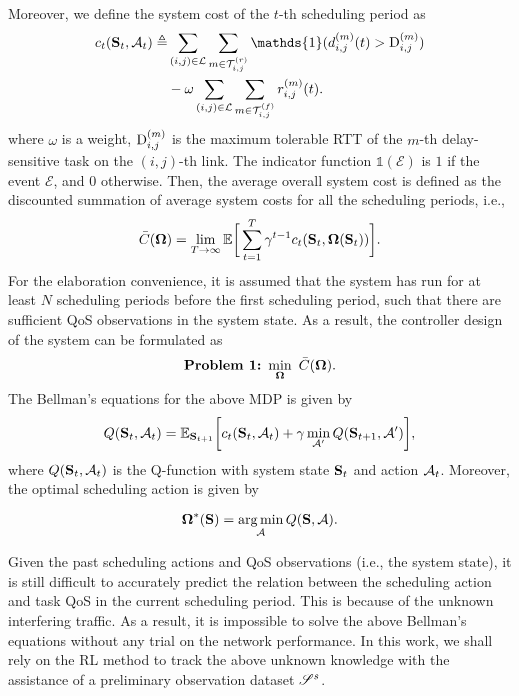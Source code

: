 Moreover, we define the system cost of the $t$-th scheduling period as
\begin{align}
    \label{eq:cost function}
    \begin{split}
        c_t(\state_t, \action_t)
        \define
         & \sum_{\iterLink} \sum_{\iterTaskRTT}
        \mathds{1}(\eleRTT(t) > \eleRTTLimit)                          \\
         & - \omega \sum_{\iterLink} \sum_{\iterTaskThru} \eleThru(t).
    \end{split}
\end{align}
where $\omega$ is a weight, $\mathrm{D}_{i,j}^{(m)}$ is the maximum tolerable RTT of the $m$-th delay-sensitive task on the $(i,j)$-th link. The indicator function $\mathds{1}(\mathcal{E})$ is $1$ if the event $\mathcal{E}$, and $0$ otherwise.
Then, the average overall system cost is defined as the discounted summation of average system costs for all the scheduling periods, i.e.,
\begin{equation}
    \label{eq:average_cost}
    \bar{C}(\boldsymbol{\Omega}) = \lim_{T \rightarrow \infty} \mathbb{E}
    \bigg[
        \sum_{t = 1}^T \gamma^{t-1} c_t(\mathbf{S}_t, \boldsymbol{\Omega}(\mathbf{S}_t))
        \bigg].
\end{equation}
For the elaboration convenience, it is assumed that the system has run for at least $N$ scheduling periods before the first scheduling period, such that there are sufficient QoS observations in the system state. As a result, the controller design of the {\algName} system can be formulated as
\begin{equation}
    \text{\bf Problem 1:} \ \min_{\boldsymbol{\Omega}} \  \bar{C}(\boldsymbol{\Omega}).
\end{equation}
The Bellman's equations for the above MDP is given by
\begin{align}
    \label{eq:bellman}
    Q(\mathbf{S}_t, \mathcal{A}_t) = \mathbb{E}_{\mathbf{S}_{t+1}} \bigg[ c_t(\mathbf{S}_t, \mathcal{A}_t) + \gamma \min_{\mathcal{A}'} Q(\mathbf{S}_{t+1}, \mathcal{A}')  \bigg],
\end{align}
where $Q(\mathbf{S}_t, \mathcal{A}_t)$ is the Q-function with system state $\mathbf{S}_t$ and action $\mathcal{A}_t$. Moreover, the optimal scheduling action is given by

\begin{equation}
    \boldsymbol{\Omega}^*(\mathbf{S})  = \operatorname*{arg\,min}\limits_{\mathcal{A}} Q(\mathbf{S}, \mathcal{A}).
\end{equation}

Given the past scheduling actions and QoS observations (i.e., the system state), it is still difficult to accurately predict the relation between the scheduling action and task QoS in the current scheduling period. This is because of the unknown interfering traffic. As a result, it is impossible to solve the above Bellman's equations without any trial on the network performance. In this work, we shall rely on the RL method to track the above unknown knowledge with the assistance of a preliminary observation dataset $\mathscr{S}^{s}$.

